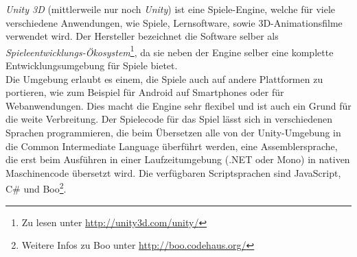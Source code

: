 \textit{Unity 3D} (mittlerweile nur noch \textit{Unity}) ist eine Spiele-Engine, welche für viele verschiedene Anwendungen, wie Spiele, Lernsoftware, sowie 3D-Animationsfilme verwendet wird. Der Hersteller bezeichnet die Software selber als \textit{Spieleentwicklungs-Ökosystem}\footnote{Zu lesen unter \url{http://unity3d.com/unity/}}, da sie neben der Engine selber eine komplette Entwicklungsumgebung für Spiele bietet.\\
Die Umgebung erlaubt es einem, die Spiele auch auf andere Plattformen zu portieren, wie zum Beispiel für Android auf Smartphones oder für Webanwendungen. Dies macht die Engine sehr flexibel und ist auch ein Grund für die weite Verbreitung. Der Spielecode für das Spiel lässt sich in verschiedenen Sprachen programmieren, die beim Übersetzen alle von der Unity-Umgebung in die Common Intermediate Language überführt werden, eine Assemblersprache, die erst beim Ausführen in einer Laufzeitumgebung (.NET oder Mono) in nativen Maschinencode übersetzt wird. Die verfügbaren Scriptsprachen sind JavaScript, C\# und Boo\footnote{Weitere Infos zu Boo unter \url{http://boo.codehaus.org/}}.


